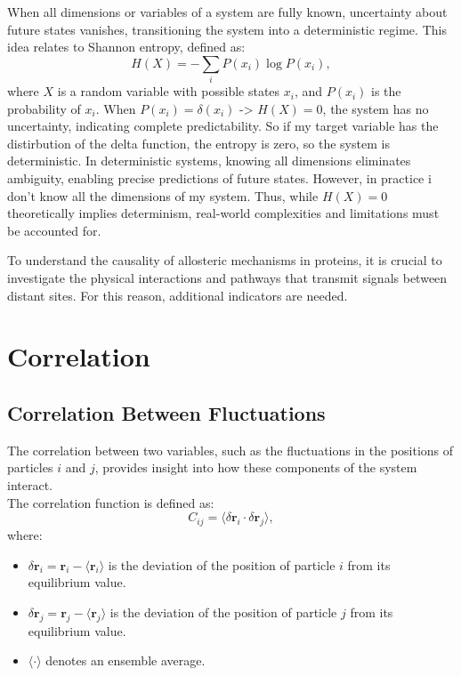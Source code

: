 \documentclass[English, Lau, oneside]{sapthesis}
\begin{document}
\noindent When all dimensions or variables of a system are fully known, uncertainty about future states vanishes, transitioning the system into a deterministic regime. This idea relates to Shannon entropy, defined as:
\[
H(X) = -\sum_{i} P(x_i) \log P(x_i),
\]
where \( X \) is a random variable with possible states \( x_i \), and \( P(x_i) \) is the probability of \( x_i \). When \( P(x_i) = \delta(x_i) \) -> \( H(X) = 0 \), the system has no uncertainty, indicating complete predictability.
So if my target variable has the distirbution of the delta function, the entropy is zero, so the system is deterministic.
In deterministic systems, knowing all dimensions eliminates ambiguity, enabling precise predictions of future states. However, in practice i don't know all the dimensions of my system.
Thus, while \( H(X) = 0 \) theoretically implies determinism, real-world complexities and limitations must be accounted for.


To understand the causality of allosteric mechanisms in proteins, it is crucial to investigate the physical interactions and pathways that transmit signals between distant sites. For this reason, additional indicators are needed.
\newpage
\section*{Correlation}
\subsection{Correlation Between Fluctuations}
\noindent
The correlation between two variables, such as the fluctuations in the positions of particles \( i \) and \( j \), provides insight into how these components of the system interact.\\
The correlation function is defined as:\cite{ref13}
\begin{equation}
    C_{ij} = \langle \delta \mathbf{r}_i \cdot \delta \mathbf{r}_j \rangle, \label{correlation}
\end{equation}
where:
\begin{itemize}
    \item \( \delta \mathbf{r}_i = \mathbf{r}_i - \langle \mathbf{r}_i \rangle \) is the deviation of the position of particle \( i \) from its equilibrium value.
    \item \( \delta \mathbf{r}_j = \mathbf{r}_j - \langle \mathbf{r}_j \rangle \) is the deviation of the position of particle \( j \) from its equilibrium value.
    \item \( \langle \cdot \rangle \) denotes an ensemble average.
\end{itemize}
\end{document}
